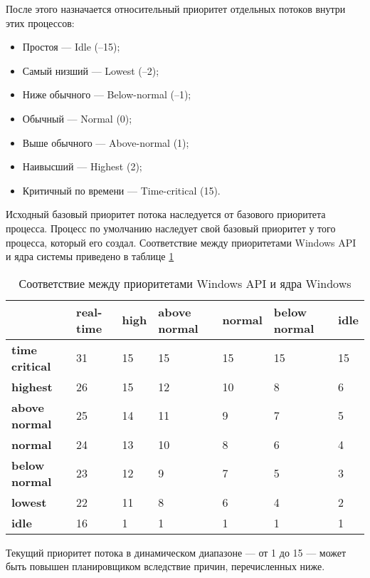 После этого назначается относительный приоритет отдельных потоков внутри этих процессов:
\begin{itemize}[label=---]
	\item Простоя — Idle (–15);
	\item  Самый низший — Lowest (–2);
	\item Ниже обычного — Below-normal (–1);
	\item Обычный — Normal (0);
	\item Выше обычного — Above-normal (1);
	\item Наивысший — Highest (2);
	\item Критичный по времени — Time-critical (15).
\end{itemize}

Исходный базовый приоритет потока наследуется от базового приоритета процесса. Процесс по умолчанию наследует свой базовый приоритет у того процесса, который его создал. Соответствие между приоритетами Windows API и ядра системы приведено в таблице \ref{tbl:priority}


\begin{table}[h]
	\captionsetup{justification=raggedright,singlelinecheck=off,margin=2mm}
	\caption{Соответствие между приоритетами Windows API и ядра Windows}
	\begin{center}
		\begin{tabular}{|l|p{45pt}|p{45pt}|p{45pt}|p{45pt}|p{45pt}|p{45pt}|}
			\hline
			{} & \textbf{real-time} & \textbf{high} & \textbf{above normal} & \textbf{normal} & \textbf{below normal} & \textbf{idle}\\
			\hline
			\textbf{time critical} & 31 & 15 & 15 & 15 & 15 & 15 \\
			\hline
			\textbf{highest} & 26 & 15 & 12 & 10 & 8 & 6 \\
			\hline
			\textbf{above normal} & 25 & 14 & 11 & 9 & 7 & 5 \\
			\hline
			\textbf{normal} & 24 & 13 & 10 & 8 & 6 & 4 \\
			\hline
			\textbf{below normal} & 23 & 12 & 9 & 7 & 5 & 3 \\
			\hline
			\textbf{lowest} & 22 & 11 & 8 & 6 & 4 & 2 \\
			\hline
			\textbf{idle} & 16 & 1 & 1 & 1 & 1 & 1 \\
			\hline
		\end{tabular}
	\end{center}
	\label{tbl:priority}
\end{table}
\newpage

Текущий приоритет потока в динамическом диапазоне --- от 1 до 15 --- может быть повышен планировщиком вследствие причин, перечисленных ниже.

